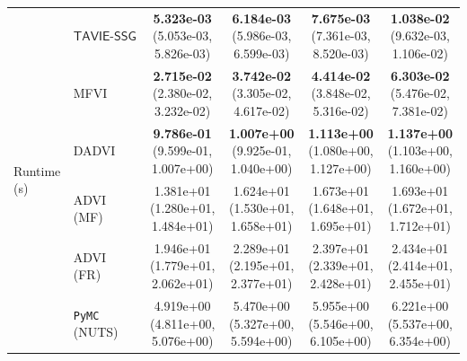 \documentclass[12pt]{article}
\numberwithin{equation}{section}
\newcommand{\tssg}{\mathsf{TAVIE}\text{-}\mathsf{SSG}}
\begin{document}
{\begin{longtable}{llcccc}
\multirow{6}{*}{Runtime (s)}
& $\tssg$ & \makecell[c]{\textbf{5.323e-03}\\(5.053e-03, 5.826e-03)} & \makecell[c]{\textbf{6.184e-03}\\(5.986e-03, 6.599e-03)} & \makecell[c]{\textbf{7.675e-03}\\(7.361e-03, 8.520e-03)} & \makecell[c]{\textbf{1.038e-02}\\(9.632e-03, 1.106e-02)} \\
& MFVI & \makecell[c]{\textbf{2.715e-02}\\(2.380e-02, 3.232e-02)} & \makecell[c]{\textbf{3.742e-02}\\(3.305e-02, 4.617e-02)} & \makecell[c]{\textbf{4.414e-02}\\(3.848e-02, 5.316e-02)} & \makecell[c]{\textbf{6.303e-02}\\(5.476e-02, 7.381e-02)} \\
& DADVI & \makecell[c]{\textbf{9.786e-01}\\(9.599e-01, 1.007e+00)} & \makecell[c]{\textbf{1.007e+00}\\(9.925e-01, 1.040e+00)} & \makecell[c]{\textbf{1.113e+00}\\(1.080e+00, 1.127e+00)} & \makecell[c]{\textbf{1.137e+00}\\(1.103e+00, 1.160e+00)} \\
& ADVI (MF) & \makecell[c]{1.381e+01\\(1.280e+01, 1.484e+01)} & \makecell[c]{1.624e+01\\(1.530e+01, 1.658e+01)} & \makecell[c]{1.673e+01\\(1.648e+01, 1.695e+01)} & \makecell[c]{1.693e+01\\(1.672e+01, 1.712e+01)} \\
& ADVI (FR) & \makecell[c]{1.946e+01\\(1.779e+01, 2.062e+01)} & \makecell[c]{2.289e+01\\(2.195e+01, 2.377e+01)} & \makecell[c]{2.397e+01\\(2.339e+01, 2.428e+01)} & \makecell[c]{2.434e+01\\(2.414e+01, 2.455e+01)} \\
& \texttt{PyMC} (NUTS) & \makecell[c]{4.919e+00\\(4.811e+00, 5.076e+00)} & \makecell[c]{5.470e+00\\(5.327e+00, 5.594e+00)} & \makecell[c]{5.955e+00\\(5.546e+00, 6.105e+00)} & \makecell[c]{6.221e+00\\(5.537e+00, 6.354e+00)} \\
\hline
\end{longtable}
}
\end{document}
